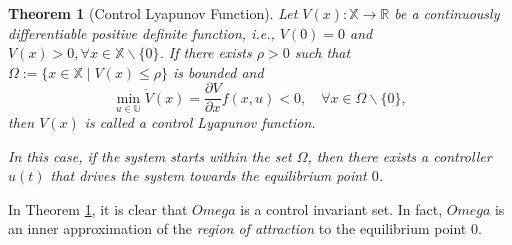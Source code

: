 \documentclass[
]{book}
\newtheorem{theorem}{Theorem}[chapter]
\theoremstyle{definition}
\theoremstyle{definition}
\theoremstyle{definition}
\theoremstyle{definition}
\theoremstyle{remark}
\begin{document}
\begin{theorem}[Control Lyapunov Function]
\protect\hypertarget{thm:control-lyapunov}{}\label{thm:control-lyapunov}Let \(V(x): \mathbb{X} \rightarrow \mathbb{R}\) be a continuously differentiable positive definite function, i.e., \(V(0) = 0\) and \(V(x) > 0, \forall x \in \mathbb{X} \backslash \{ 0 \}\). If there exists \(\rho > 0\) such that \(\Omega := \{ x \in \mathbb{X} \mid V(x) \leq \rho \}\) is bounded and
\begin{equation}
\min_{u \in \mathbb{U}} \dot{V}(x) = \frac{\partial V}{\partial x} f(x,u) < 0, \quad \forall x \in \Omega \backslash \{ 0 \},
\label{eq:clf-derivative-condition}
\end{equation}
then \(V(x)\) is called a control Lyapunov function.

In this case, if the system starts within the set \(\Omega\), then there exists a controller \(u(t)\) that drives the system towards the equilibrium point \(0\).
\end{theorem}

In Theorem \ref{thm:control-lyapunov}, it is clear that \(Omega\) is a control invariant set. In fact, \(Omega\) is an inner approximation of the \emph{region of attraction} to the equilibrium point \(0\).
\end{document}
